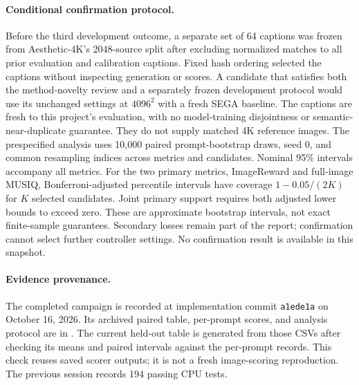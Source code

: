 \paragraph{Conditional confirmation protocol.}
Before the third development outcome, a separate set of 64 captions was frozen
from Aesthetic-4K's 2048-source split after excluding normalized matches to all
prior evaluation and calibration captions. Fixed hash ordering selected the
captions without inspecting generation or scores. A candidate that satisfies
both the method-novelty review and a separately frozen development protocol would
use its unchanged settings at $4096^2$ with a fresh SEGA baseline. The captions
are fresh to this project's evaluation, with no model-training disjointness or
semantic-near-duplicate guarantee. They do not supply matched 4K reference images.
The prespecified analysis uses 10,000 paired prompt-bootstrap draws, seed 0,
and common resampling indices across metrics and candidates. Nominal 95\%
intervals accompany all metrics. For the two primary metrics, ImageReward and
full-image MUSIQ, Bonferroni-adjusted percentile intervals have coverage
$1-0.05/(2K)$ for $K$ selected candidates. Joint primary support requires both
adjusted lower bounds to exceed zero. These are approximate bootstrap intervals,
not exact finite-sample guarantees. Secondary losses remain part of the report;
confirmation cannot select further controller settings. No confirmation result
is available in this snapshot.

\paragraph{Evidence provenance.}
The completed campaign is recorded at implementation commit
\texttt{a1ede1a} on October 16, 2026. Its archived paired table, per-prompt
scores, and analysis protocol are in .
The current held-out table is generated from those CSVs after checking its
means and paired intervals against the per-prompt records. This check reuses
saved scorer outputs; it is not a fresh image-scoring reproduction.
The previous session records 194 passing CPU tests.
